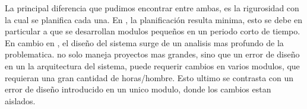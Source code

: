 	La principal diferencia que pudimos encontrar entre ambas, es la rigurosidad con la cual se planifica cada una. En \pis, la planificación resulta minima, esto se debe en particular a que se desarrollan modulos pequeños en un periodo corto de tiempo. En cambio en \pil, el diseño del sistema surge de un analisis mas profundo de la problematica. \pil no solo maneja proyectos mas grandes, sino que un error de diseño en un la arquitectura del sistema, puede requerir cambios en varios modulos, que requieran una gran cantidad de horas/hombre. Esto ultimo se contrasta con un error de diseño introducido en un unico modulo, donde los cambios estan aislados.

